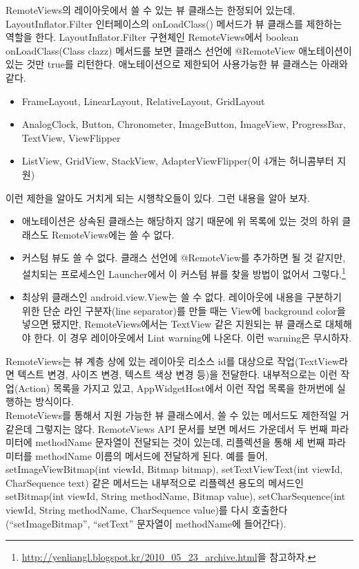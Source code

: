 RemoteViews의 레이아웃에서 쓸 수 있는 뷰 클래스는 한정되어 있는데, LayoutInflator.Filter 인터페이스의  onLoadClass() 메서드가 뷰 클래스를 제한하는 역할을 한다. LayoutInflator.Filter 구현체인 RemoteViews에서 boolean onLoadClass(Class clazz) 메서드를 보면 클래스 선언에 @RemoteView 애노테이션이 있는 것만 true를 리턴한다.
애노테이션으로 제한되어 사용가능한 뷰 클래스는 아래와 같다.
\begin{itemize}
\item FrameLayout, LinearLayout, RelativeLayout, GridLayout
\item AnalogClock, Button, Chronometer, ImageButton, ImageView, ProgressBar, TextView, ViewFlipper
\item ListView, GridView, StackView, AdapterViewFlipper(이 4개는 허니콤부터 지원)
\end{itemize}

이런 제한을 알아도 거치게 되는 시행착오들이 있다. 그런 내용을 알아 보자.
\begin{itemize}
\item 애노테이션은 상속된 클래스는 해당하지 않기 때문에 위 목록에 있는 것의 하위 클래스도 RemoteViews에는 쓸 수 없다.
\item 커스텀 뷰도 쓸 수 없다. 클래스 선언에 @RemoteView를 추가하면 될 것 같지만, 설치되는 프로세스인 Launcher에서 이 커스텀 뷰를 찾을 방법이 없어서 그렇다.\footnote{\url{http://yenliangl.blogspot.kr/2010\_05\_23\_archive.html}을 참고하자.}
\item 최상위 클래스인 android.view.View는 쓸 수 없다. 레이아웃에 내용을 구분하기 위한 단순 라인 구분자(line separator)를 만들 때는 View에 background color을 넣으면 됐지만, RemoteViews에서는 TextView 같은 지원되는 뷰 클래스로 대체해야 한다. 이 경우 레이아웃에서 Lint warning에 나온다. 이런 warning은 무시하자.
\end{itemize}

RemoteViews는 뷰 계층 상에 있는 레이아웃 리소스 id를 대상으로 작업(TextView라면 텍스트 변경, 사이즈 변경, 텍스트 색상 변경 등)을 전달한다.
내부적으로는 이런 작업(Action) 목록을 가지고 있고, AppWidgetHost에서 이런 작업 목록을 한꺼번에 실행하는 방식이다.\\

RemoteViews를 통해서 지원 가능한 뷰 클래스에서, 쓸 수 있는 메서드도 제한적일 거 같은데 그렇지는 않다. 
RemoteViews API 문서를 보면 메서드 가운데서 두 번째 파라미터에 methodName 문자열이 전달되는 것이 있는데, 리플렉션을 통해 세 번째 파라미터를 methodName 이름의 메서드에 전달하게 된다. 
예를 들어, setImageViewBitmap(int viewId, Bitmap bitmap), setTextViewText(int viewId, CharSequence text) 같은 메서드는 내부적으로 리플렉션 용도의 메서드인 setBitmap(int viewId, String methodName, Bitmap value), setCharSequence(int viewId, String methodName, CharSequence value)를 다시 호출한다(``setImageBitmap'', ``setText'' 문자열이 methodName에 들어간다).

